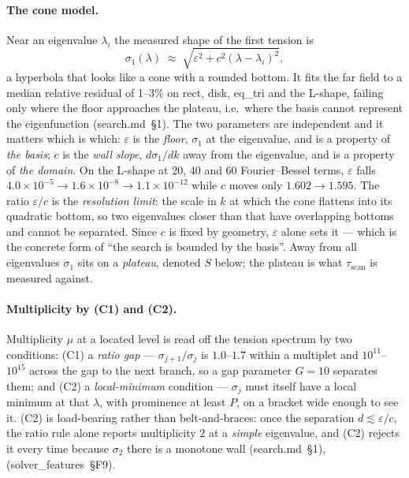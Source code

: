 \documentclass[11pt]{article}
\newcommand{\sm}[1]{(search.md~\S#1)}
\newcommand{\sfe}[1]{(solver\_features~\S#1)}
\newcommand{\sig}{\sigma}
\newcommand{\sione}{\sig_1}
\newcommand{\sitwo}{\sig_2}
\newcommand{\lam}{\lambda}
\begin{document}
\paragraph{The cone model.}
Near an eigenvalue $\lam_i$ the measured shape of the first tension is
\begin{equation}
  \sione(\lam) \;\approx\; \sqrt{\varepsilon^2 + c^2 (\lam-\lam_i)^2},
  \label{eq:cone}
\end{equation}
a hyperbola that looks like a cone with a rounded bottom. It fits the far field to a median
relative residual of 1--3\% on rect, disk, eq\_tri and the L-shape, failing only where the
floor approaches the plateau, i.e.\ where the basis cannot represent the eigenfunction
\sm{1}. The two parameters are independent and it matters which is which:
$\varepsilon$ is the \emph{floor}, $\sione$ at the eigenvalue, and is a property of
\emph{the basis}; $c$ is the \emph{wall slope}, $d\sione/dk$ away from the eigenvalue, and is a
property of \emph{the domain}. On the L-shape at 20, 40 and 60 Fourier--Bessel terms,
$\varepsilon$ falls $4.0\times10^{-5} \to 1.6\times10^{-8} \to 1.1\times10^{-12}$ while $c$
moves only $1.602 \to 1.595$. The ratio $\varepsilon/c$ is the \emph{resolution limit}: the
scale in $k$ at which the cone flattens into its quadratic bottom, so two eigenvalues closer
than that have overlapping bottoms and cannot be separated. Since $c$ is fixed by geometry,
$\varepsilon$ alone sets it --- which is the concrete form of ``the search is bounded by the
basis''. Away from all eigenvalues $\sione$ sits on a \emph{plateau}, denoted $S$ below; the
plateau is what $\tau_{\mathrm{scan}}$ is measured against.

\paragraph{Multiplicity by (C1) and (C2).}
Multiplicity $\mu$ at a located level is read off the tension spectrum by two conditions:
(C1) a \emph{ratio gap} --- $\sig_{j+1}/\sig_j$ is $1.0$--$1.7$ within a multiplet and
$10^{11}$--$10^{15}$ across the gap to the next branch, so a gap parameter $G=10$ separates
them; and (C2) a \emph{local-minimum} condition --- $\sig_j$ must itself have a local minimum
at that $\lam$, with prominence at least $P$, on a bracket wide enough to see it. (C2) is
load-bearing rather than belt-and-braces: once the separation $d \lesssim \varepsilon/c$, the
ratio rule alone reports multiplicity $2$ at a \emph{simple} eigenvalue, and (C2) rejects it
every time because $\sitwo$ there is a monotone wall \sm{1}, \sfe{F9}.
\end{document}
